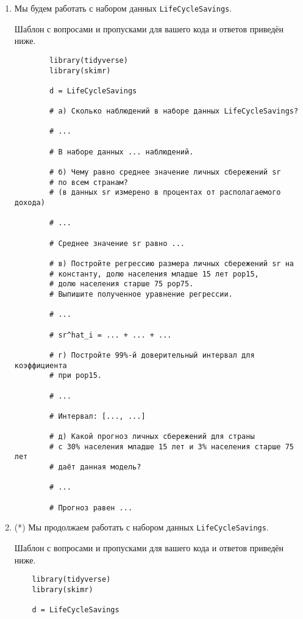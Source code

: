 \documentclass[12pt]{article}
\begin{document}
\begin{enumerate}
\newpage
    \item Мы будем работать с набором данных \verb|LifeCycleSavings|.

    Шаблон с вопросами и пропусками для вашего кода и ответов приведён ниже. 

    \begin{verbatim}
        library(tidyverse)
        library(skimr)

        d = LifeCycleSavings

        # а) Сколько наблюдений в наборе данных LifeCycleSavings?

        # ...

        # В наборе данных ... наблюдений.

        # б) Чему равно среднее значение личных сбережений sr 
        # по всем странам? 
        # (в данных sr измерено в процентах от располагаемого дохода)

        # ...

        # Среднее значение sr равно ... 

        # в) Постройте регрессию размера личных сбережений sr на 
        # константу, долю населения младше 15 лет pop15, 
        # долю населения старше 75 pop75.
        # Выпишите полученное уравнение регрессии. 

        # ...

        # sr^hat_i = ... + ... + ... 

        # г) Постройте 99%-й доверительный интервал для коэффициента 
        # при pop15. 

        # ...

        # Интервал: [..., ...]

        # д) Какой прогноз личных сбережений для страны 
        # с 30% населения младше 15 лет и 3% населения старше 75 лет
        # даёт данная модель?

        # ...

        # Прогноз равен ...
    \end{verbatim}

    \newpage
\item (*) Мы продолжаем работать с набором данных \verb|LifeCycleSavings|.

Шаблон с вопросами и пропусками для вашего кода и ответов приведён ниже. 

\begin{verbatim}
    library(tidyverse)
    library(skimr)

    d = LifeCycleSavings


\end{verbatim}
\end{enumerate}
\end{document}
